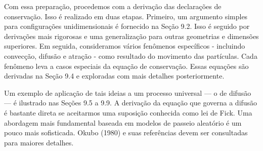 {{Com essa preparação, procedemos com a derivação das declarações de conservação. Isso é realizado em duas etapas. Primeiro, um argumento simples para configurações unidimensionais é fornecido na Seção 9.2. Isso é seguido por derivações mais rigorosas e uma generalização para outras geometrias e dimensões superiores. Em seguida, consideramos vários fenômenos específicos - incluindo convecção, difusão e atração - como resultado do movimento das partículas. Cada fenômeno leva a casos especiais da equação de conservação. Essas equações são derivadas na Seção 9.4 e exploradas com mais detalhes posteriormente.}}

{{Um exemplo de aplicação de tais ideias a um processo universal --- o de difusão --- é ilustrado nas Seções 9.5 a 9.9. A derivação da equação que governa a difusão é bastante direta se aceitarmos uma suposição conhecida como lei de Fick. Uma abordagem mais fundamental baseada em modelos de passeio aleatório é um pouco mais sofisticada. Okubo (1980) e suas referências devem ser consultadas para maiores detalhes.}}

